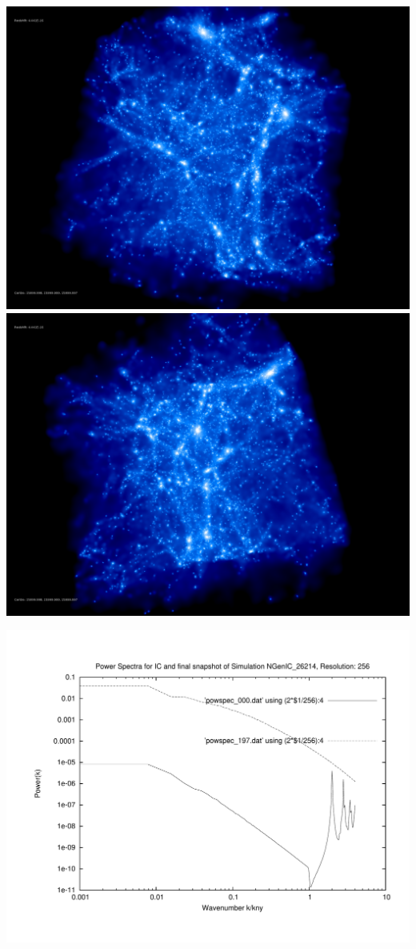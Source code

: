 \includegraphics[scale=0.1]{r256/h100/NGenIC_26214/rotate_00074.jpg} 
\includegraphics[scale=0.1]{r256/h100/NGenIC_26214/rotate_00131.jpg}

\includegraphics[scale=0.5]{r256/h100/NGenIC_26214/plot_powspec_NGenIC_26214}

